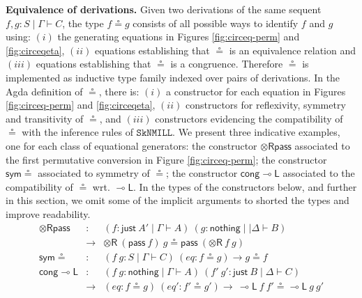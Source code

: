 \documentclass[sn-mathphys-num]{sn-jnl}%
\newcommand{\GG}{\Gamma}
\newcommand{\GD}{\Delta}
\newcommand{\vd}{\vdash}
\newcommand{\tr}{\otimes\mathsf{R}}
\newcommand{\pass}{\mathsf{pass}}
\newcommand{\lolli}{\multimap}
\newcommand{\lleft}{{\lolli}\mathsf{L}}
\newcommand{\SkNMILL}{$\mathtt{SkNMILL}$}
\newcommand{\nothing}{\mathsf{nothing}}
\newcommand{\just}{\mathsf{just}}
\theoremstyle{thmstyleone}%
\theoremstyle{thmstyletwo}%
\theoremstyle{thmstylethree}%
\begin{document}
\noindent\textbf{Equivalence of derivations.}
Given two derivations of the same sequent $f,g : S \mid \Gamma \vdash C$, the type $f \circeq g$ consists of all possible ways to identify $f$ and $g$ using: $(i)$ the generating equations in Figures \ref{fig:circeq-perm} and \ref{fig:circeqeta}, $(ii)$ equations establishing that $\circeq$ is an equivalence relation and $(iii)$ equations establishing that $\circeq$ is a congruence. 
Therefore $\circeq$ is implemented as inductive type family indexed over pairs of derivations.
In the Agda definition of $\circeq$, there is: $(i)$ a constructor for each equation in Figures \ref{fig:circeq-perm} and \ref{fig:circeqeta}, $(ii)$  constructors for reflexivity, symmetry and transitivity of $\circeq$, and  $(iii)$ constructors evidencing the compatibility of $\circeq$ with the inference rules of \SkNMILL.
We present three indicative examples, one for each class of equational generators: the constructor $\tr\pass$ associated to the first permutative conversion in Figure  \ref{fig:circeq-perm}; the constructor $\mathsf{sym}{\circeq}$ associated to symmetry of $\circeq$; the constructor $\mathsf{cong}\lleft$ associated to the compatibility of $\circeq$ wrt. $\lleft$. In the types of the constructors below, and further in this section, we omit some of the implicit arguments to shorted the types and improve readability.
\[
\begin{array}{rcl}
\tr\pass &:&  (f : \just ~A' \mid \GG \vd A) ~(g : \nothing \mid \mid \GD \vd B) \\
&\to& \tr ~(\pass ~f) ~g \circeq \pass~(\tr~f~g)  \\[2pt]
\mathsf{sym}{\circeq} &:& (f ~g : S \mid \GG \vd C) ~(eq : f \circeq g) \to g \circeq f \\[2pt]
\mathsf{cong}\lleft &:& (f ~g : \nothing \mid \GG \vd A) ~(f' ~g' : \just ~B \mid \GD \vd C) \\
& \to & (eq : f \circeq g) ~(eq' : f' \circeq g') \to \, \lleft ~f ~f' \circeq \lleft ~g ~g'
\end{array}
\]
\end{document}

